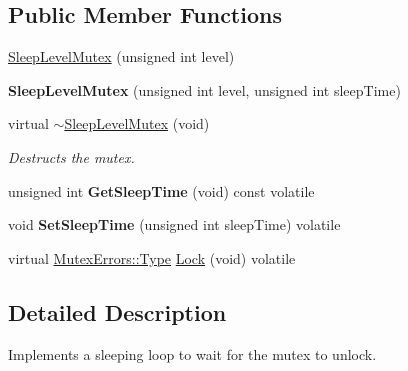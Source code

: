 \subsection*{Public Member Functions}
\begin{DoxyCompactItemize}
\item 
\hyperlink{classLoki_1_1SleepLevelMutex_a89785c46dc2bde328e1908e25d6b747b}{Sleep\+Level\+Mutex} (unsigned int level)
\item 
\hypertarget{classLoki_1_1SleepLevelMutex_a843adc810a6eb218f88b5a49ab1ff595}{}{\bfseries Sleep\+Level\+Mutex} (unsigned int level, unsigned int sleep\+Time)\label{classLoki_1_1SleepLevelMutex_a843adc810a6eb218f88b5a49ab1ff595}

\item 
\hypertarget{classLoki_1_1SleepLevelMutex_a4c415349db989e7f2a8f2e02cbf9db88}{}virtual \hyperlink{classLoki_1_1SleepLevelMutex_a4c415349db989e7f2a8f2e02cbf9db88}{$\sim$\+Sleep\+Level\+Mutex} (void)\label{classLoki_1_1SleepLevelMutex_a4c415349db989e7f2a8f2e02cbf9db88}

\begin{DoxyCompactList}\small\item\em Destructs the mutex. \end{DoxyCompactList}\item 
\hypertarget{classLoki_1_1SleepLevelMutex_a4d568e01ba25efc755de8a582db42d36}{}unsigned int {\bfseries Get\+Sleep\+Time} (void) const  volatile\label{classLoki_1_1SleepLevelMutex_a4d568e01ba25efc755de8a582db42d36}

\item 
\hypertarget{classLoki_1_1SleepLevelMutex_a0c4c85290c0f496a2e56bfd4dab963c7}{}void {\bfseries Set\+Sleep\+Time} (unsigned int sleep\+Time) volatile\label{classLoki_1_1SleepLevelMutex_a0c4c85290c0f496a2e56bfd4dab963c7}

\item 
virtual \hyperlink{classLoki_1_1MutexErrors_acd0eb6065ca303083d2e0229d7bff590}{Mutex\+Errors\+::\+Type} \hyperlink{classLoki_1_1SleepLevelMutex_ae0f17a3b7641466c7611f5921d0c95e6}{Lock} (void) volatile
\end{DoxyCompactItemize}


\subsection{Detailed Description}
Implements a sleeping loop to wait for the mutex to unlock.

